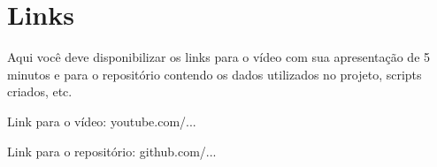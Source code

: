 \chapter{Links}

Aqui você deve disponibilizar os links para o vídeo com sua apresentação de 5 minutos e para o repositório contendo os dados utilizados no projeto, scripts criados, etc. 
 
Link para o vídeo: youtube.com/... 

Link para o repositório: github.com/... 